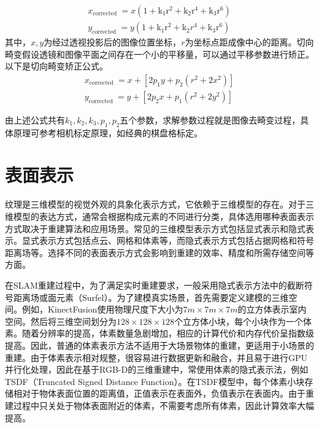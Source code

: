 \begin{equation}
\begin{array}{l}
x_{\text {corrected }}=x\left(1+\mathrm{k}_{1} \mathrm{r}^{2}+\mathrm{k}_{2} \mathrm{r}^{4}+\mathrm{k}_{3} \mathrm{r}^{6}\right) \\
y_{\text {corrected }}=y\left(1+\mathrm{k}_{1} \mathrm{r}^{2}+\mathrm{k}_{2} r^{4}+\mathrm{k}_{3} \mathrm{r}^{6}\right)
\end{array}
\end{equation}
其中，$x,y$为经过透视投影后的图像位置坐标，$r$为坐标点距成像中心的距离。切向畸变假设透镜和图像平面之间存在一个小的平移量，可以通过平移参数进行矫正。以下是切向畸变矫正公式。
\begin{equation}
\begin{array}{l}
x_{\text {corrected }}=x+\left[2 p_{1} y+p_{2}\left(r^{2}+2 x^{2}\right)\right] \\
y_{\text {corrected }}=y+\left[2 p_{2} x+p_{1}\left(r^{2}+2 y^{2}\right)\right]
\end{array}
\end{equation}

由上述公式共有$k_1,k_2,k_3,p_1,p_2$五个参数，求解参数过程就是图像去畸变过程，具体原理可参考相机标定原理，如经典的棋盘格标定。

%
%
\section{表面表示}
纹理是三维模型的视觉外观的具象化表示方式，它依赖于三维模型的存在。对于三维模型的表达方式，通常会根据构成元素的不同进行分类，具体选用哪种表面表示方式取决于重建算法和应用场景。常见的三维模型表示方式包括显式表示和隐式表示。显式表示方式包括点云、网格和体素等，而隐式表示方式包括占据网格和符号距离场等。选择不同的表面表示方式会影响到重建的效率、精度和所需存储空间等方面。\par

在SLAM重建过程中，为了满足实时重建要求，一般采用隐式表示方法中的截断符号距离场或面元素（Surfel）。为了建模真实场景，首先需要定义建模的三维空间。例如，KinectFusion使用物理尺度下大小为$7m \times 7m \times 7m$的立方体表示室内空间。然后将三维空间划分为$128 \times 128 \times 128$个立方体小块，每个小块作为一个体素。随着分辨率的提高，体素数量急剧增加，相应的计算代价和内存代价呈指数级提高。因此，普通的体素表示方法不适用于大场景物体的重建，更适用于小场景的重建。由于体素表示相对规整，很容易进行数据更新和融合，并且易于进行GPU并行化处理，因此在基于RGB-D的三维重建中，常使用体素的隐式表示法，例如TSDF（Truncated Signed Distance Function）。在TSDF模型中，每个体素小块存储相对于物体表面位置的距离值，正值表示在表面外，负值表示在表面内。由于重建过程中只关处于物体表面附近的体素，不需要考虑所有体素，因此计算效率大幅提高。\par


